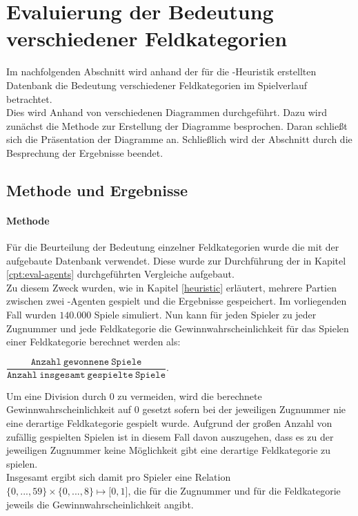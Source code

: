 \section{Evaluierung der Bedeutung verschiedener Feldkategorien}
\authormax
Im nachfolgenden Abschnitt wird anhand der für die -Heuristik erstellten Datenbank die Bedeutung verschiedener Feldkategorien im Spielverlauf betrachtet.
\\Dies wird Anhand von verschiedenen Diagrammen durchgeführt. Dazu wird zunächst die Methode zur Erstellung der Diagramme besprochen. Daran schließt sich die Präsentation der Diagramme an. Schließlich wird der Abschnitt durch die Besprechung der Ergebnisse beendet.
\subsection{Methode und Ergebnisse}
\paragraph{Methode}
Für die Beurteilung der Bedeutung einzelner Feldkategorien wurde die mit der  aufgebaute Datenbank verwendet. Diese wurde zur Durchführung der in Kapitel \ref{cpt:eval-agents} durchgeführten Vergleiche aufgebaut.
\\Zu diesem Zweck wurden, wie in Kapitel \ref{heuristic} erläutert, mehrere Partien zwischen zwei -Agenten gespielt und die Ergebnisse gespeichert. Im vorliegenden Fall wurden $140.000$ Spiele simuliert. Nun kann für jeden Spieler zu jeder Zugnummer und jede Feldkategorie die Gewinnwahrscheinlichkeit für das Spielen einer Feldkategorie berechnet werden als: 
\vspace{0.25cm}
\begin{center}
$\dfrac{\mathtt{Anzahl\ gewonnene\ Spiele}}{\mathtt{Anzahl\ insgesamt\ gespielte\ Spiele}}$.
\end{center}
\vspace{0.25cm}
Um eine Division durch $0$ zu vermeiden, wird die berechnete Gewinnwahrscheinlichkeit auf $0$ gesetzt sofern bei der jeweiligen Zugnummer nie eine derartige Feldkategorie gespielt wurde. Aufgrund der großen Anzahl von zufällig gespielten Spielen ist in diesem Fall davon auszugehen, dass es zu der jeweiligen Zugnummer keine Möglichkeit gibt eine derartige Feldkategorie zu spielen. 
\\Insgesamt ergibt sich damit pro Spieler eine Relation $\lbrace0, ..., 59\rbrace\times\lbrace0, ..., 8\rbrace\mapsto\lbrack0,1\rbrack$, die für die Zugnummer und für die Feldkategorie jeweils die Gewinnwahrscheinlichkeit angibt.
  
